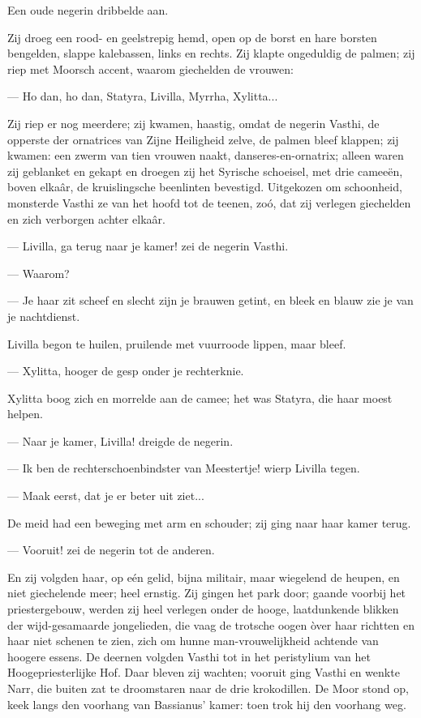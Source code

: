 \documentclass[a4paper, 12pt, oneside, dutch]{article}
\begin{document}
Een oude negerin dribbelde aan.

Zij droeg een rood- en geelstrepig hemd, open op de borst en hare borsten bengelden, slappe kalebassen, links en rechts. Zij klapte ongeduldig de palmen; zij riep met Moorsch accent, waarom giechelden de vrouwen:

--- Ho dan, ho dan, Statyra, Livilla, Myrrha, Xylitta...

Zij riep er nog meerdere; zij kwamen, haastig, omdat de negerin Vasthi, de opperste der ornatrices van Zijne Heiligheid zelve, de palmen bleef klappen; zij kwamen: een zwerm van tien vrouwen naakt, danseres-en-ornatrix; alleen waren zij geblanket en gekapt en droegen zij het Syrische schoeisel, met drie cameeën, boven elkaâr, de kruislingsche beenlinten bevestigd. Uitgekozen om schoonheid, monsterde Vasthi ze van het hoofd tot de teenen, zoó, dat zij verlegen giechelden en zich verborgen achter elkaâr.

--- Livilla, ga terug naar je kamer! zei de negerin Vasthi.

--- Waarom?

--- Je haar zit scheef en slecht zijn je brauwen getint, en bleek en blauw zie je van je nachtdienst.

Livilla begon te huilen, pruilende met vuurroode lippen, maar bleef.

--- Xylitta, hooger de gesp onder je rechterknie.

Xylitta boog zich en morrelde aan de camee; het was Statyra, die haar moest helpen.

--- Naar je kamer, Livilla! dreigde de negerin.

--- Ik ben de rechterschoenbindster van Meestertje! wierp Livilla tegen.

--- Maak eerst, dat je er beter uit ziet...

De meid had een beweging met arm en schouder; zij ging naar haar kamer terug.

--- Vooruit! zei de negerin tot de anderen.

En zij volgden haar, op eén gelid, bijna militair, maar wiegelend de heupen, en niet giechelende meer; heel ernstig. Zij gingen het park door; gaande voorbij het priestergebouw, werden zij heel verlegen onder de hooge, laatdunkende blikken der wijd-gesamaarde jongelieden, die vaag de trotsche oogen òver haar richtten en haar niet schenen te zien, zich om hunne man-vrouwelijkheid achtende van hoogere essens. De deernen volgden Vasthi tot in het peristylium van het Hoogepriesterlijke Hof. Daar bleven zij wachten; vooruit ging Vasthi en wenkte Narr, die buiten zat te droomstaren naar de drie krokodillen. De Moor stond op, keek langs den voorhang van Bassianus' kamer: toen trok hij den voorhang weg.
\end{document}
